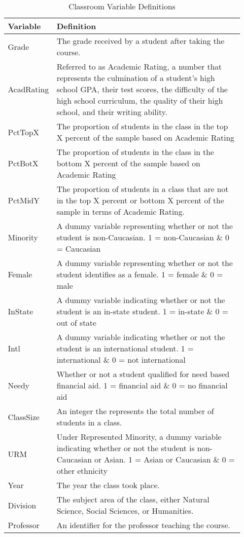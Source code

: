 \begin{table}[htb]
\centering
\caption{Classroom Variable Definitions}\label{tab:def1}
 \begin{tabular}{p{0.15\linewidth}|p{0.8\linewidth}} 
 \hline\hline
 Variable & Definition \\ [0.5ex] 
 \hline\hline
 Grade & The grade received by a student after taking the course. \\ 
 \hline
 AcadRating & Referred to as Academic Rating, a number that represents the culmination of a student's high school GPA, their test scores, the difficulty of the high school curriculum, the quality of their high school, and their writing ability. \\
 \hline
 PctTopX & The proportion of students in the class in the top X percent of the sample based on Academic Rating \\
 \hline
 PctBotX & The proportion of students in the class in the bottom X percent of the sample based on Academic Rating \\
 \hline
 PctMidY & The proportion of students in a class that are not in the top X percent or bottom X percent of the sample in terms of Academic Rating. \\
 \hline
 Minority & A dummy variable representing whether or not the student is non-Caucasian. 1 = non-Caucasian \& 0 = Caucasian\\
 \hline
 Female & A dummy variable representing whether or not the student identifies as a female. 1 = female \& 0 = male\\
 \hline
 InState & A dummy variable indicating whether or not the student is an in-state student.  1 = in-state \& 0 = out of state\\
 \hline
 Intl & A dummy variable indicating whether or not the student is an international student.  1 = international \& 0 = not international\\
 \hline
 Needy & Whether or not a student qualified for need based financial aid.  1 = financial aid \& 0 = no financial aid\\
 \hline
 ClassSize & An integer the represents the total number of students in a class. \\
 \hline
 URM & Under Represented Minority, a dummy variable indicating whether or not the student is non-Caucasian or Asian.  1 = Asian or Caucasian \& 0 = other ethnicity \\
 \hline
 Year & The year the class took place. \\
 \hline
 Division & The subject area of the class, either Natural Science, Social Sciences, or Humanities. \\
 \hline
 Professor & An identifier for the professor teaching the course. \\
[1ex] 
 \hline\hline
\end{tabular}
\end{table}

